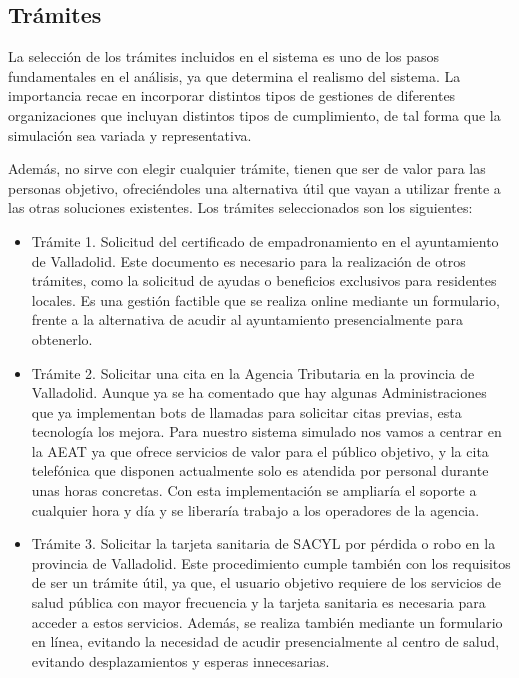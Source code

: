 \documentclass[12pt, a4paper, twoside]{report}
\begin{document}
        \subsection{Trámites}
            La selección de los trámites incluidos en el sistema es uno de los pasos fundamentales en el análisis, ya que determina el realismo del sistema. 
            La importancia recae en incorporar distintos tipos de gestiones de diferentes organizaciones que incluyan distintos tipos de cumplimiento, de tal forma que la simulación sea variada y representativa. 
            
            Además, no sirve con elegir cualquier trámite, tienen que ser de valor para las personas objetivo, ofreciéndoles una alternativa útil que vayan a utilizar frente a las otras soluciones existentes.
            Los trámites seleccionados son los siguientes:
            \begin{itemize}
                \item Trámite 1. Solicitud del certificado de empadronamiento en el ayuntamiento de Valladolid. 
                    Este documento es necesario para la realización de otros trámites, como la solicitud de ayudas o beneficios exclusivos para residentes locales. 
                    Es una gestión factible que se realiza online mediante un formulario, frente a la alternativa de acudir al ayuntamiento presencialmente para obtenerlo. 
                \item Trámite 2. Solicitar una cita en la Agencia Tributaria en la provincia de Valladolid. 
                    Aunque ya se ha comentado que hay algunas Administraciones que ya implementan bots de llamadas para solicitar citas previas, esta tecnología los mejora. 
                    Para nuestro sistema simulado nos vamos a centrar en la AEAT ya que ofrece servicios de valor para el público objetivo, y la cita telefónica que disponen actualmente solo es atendida por personal durante unas horas concretas. 
                    Con esta implementación se ampliaría el soporte a cualquier hora y día y se liberaría trabajo a los operadores de la agencia.
                \item Trámite 3. Solicitar la tarjeta sanitaria de SACYL por pérdida o robo en la provincia de Valladolid. 
                    Este procedimiento cumple también con los requisitos de ser un trámite útil, ya que, el usuario objetivo requiere de los servicios de salud pública con mayor frecuencia y la tarjeta sanitaria es necesaria para acceder a estos servicios. 
                    Además, se realiza también mediante un formulario en línea, evitando la necesidad de acudir presencialmente al centro de salud, evitando desplazamientos y esperas innecesarias.
            \end{itemize}
            
\end{document}
